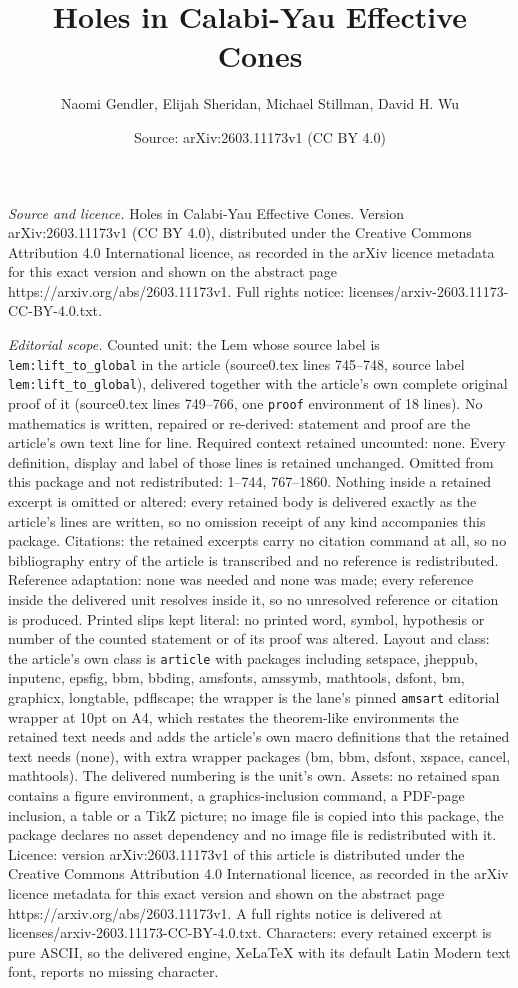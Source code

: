 \documentclass[10pt,a4paper]{amsart}
\title[Holes in Calabi-Yau Effective Cones]{Holes in Calabi-Yau Effective Cones}
\author{Naomi Gendler, Elijah Sheridan, Michael Stillman, David H. Wu}
\date{Source: arXiv:2603.11173v1 (CC BY 4.0)}
\begin{document}
\maketitle

\noindent\emph{Source and licence.} Holes in Calabi-Yau Effective Cones. Version arXiv:2603.11173v1 (CC BY 4.0), distributed under the Creative Commons Attribution 4.0 International licence, as recorded in the arXiv licence metadata for this exact version and shown on the abstract page https://arxiv.org/abs/2603.11173v1. Full rights notice: licenses/arxiv-2603.11173-CC-BY-4.0.txt.\par\smallskip

\noindent\textit{Editorial scope.} Counted unit: the Lem whose source label is \texttt{lem:lift\_to\_global} in the article (source0.tex lines 745--748, source label \texttt{lem:lift\_to\_global}), delivered together with the article's own complete original proof of it (source0.tex lines 749--766, one \texttt{proof} environment of 18 lines). No mathematics is written, repaired or re-derived: statement and proof are the article's own text line for line. Required context retained uncounted: none. Every definition, display and label of those lines is retained unchanged. Omitted from this package and not redistributed: 1--744, 767--1860. Nothing inside a retained excerpt is omitted or altered: every retained body is delivered exactly as the article's lines are written, so no omission receipt of any kind accompanies this package. Citations: the retained excerpts carry no citation command at all, so no bibliography entry of the article is transcribed and no reference is redistributed. Reference adaptation: none was needed and none was made; every reference inside the delivered unit resolves inside it, so no unresolved reference or citation is produced. Printed slips kept literal: no printed word, symbol, hypothesis or number of the counted statement or of its proof was altered. Layout and class: the article's own class is \texttt{article} with packages including setspace, jheppub, inputenc, epsfig, bbm, bbding, amsfonts, amssymb, mathtools, dsfont, bm, graphicx, longtable, pdflscape; the wrapper is the lane's pinned \texttt{amsart} editorial wrapper at 10pt on A4, which restates the theorem-like environments the retained text needs and adds the article's own macro definitions that the retained text needs (none), with extra wrapper packages (bm, bbm, dsfont, xspace, cancel, mathtools). The delivered numbering is the unit's own. Assets: no retained span contains a figure environment, a graphics-inclusion command, a PDF-page inclusion, a table or a TikZ picture; no image file is copied into this package, the package declares no asset dependency and no image file is redistributed with it. Licence: version arXiv:2603.11173v1 of this article is distributed under the Creative Commons Attribution 4.0 International licence, as recorded in the arXiv licence metadata for this exact version and shown on the abstract page https://arxiv.org/abs/2603.11173v1. A full rights notice is delivered at licenses/arxiv-2603.11173-CC-BY-4.0.txt. Characters: every retained excerpt is pure ASCII, so the delivered engine, XeLaTeX with its default Latin Modern text font, reports no missing character.
\end{document}
